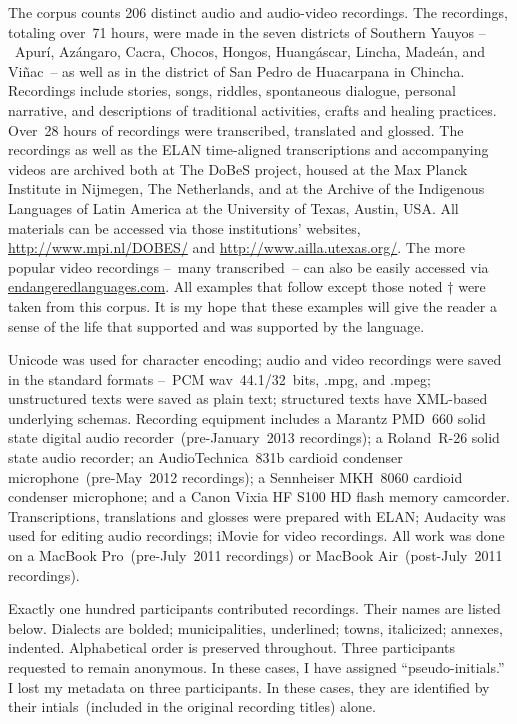 The corpus counts 206 distinct audio and audio-video recordings. The recordings, totaling over~71 hours, were made in the seven districts of Southern Yauyos --~Apurí, Azángaro, Cacra, Chocos, Hongos, Hu\-angáscar, Lincha, Madeán, and Viñac~-- as well as in the district of San Pedro de Huacarpana in Chincha. Recordings include stories, songs, riddles, spontaneous dialogue, personal narrative, and descriptions of traditional activities, crafts and healing practices. Over~28 hours of recordings were transcribed, translated and glossed. The recordings as well as the ELAN time-aligned transcriptions and accompanying videos are archived both at The DoBeS project, housed at the Max Planck Institute in Nijmegen, The Netherlands, and at the Archive of the Indigenous Languages of Latin America at the University of Texas, Austin, USA. All materials can be accessed via those institutions’ websites, \url{http://www.mpi.nl/DOBES/} and \url{http://www.ailla.utexas.org/}. The more popular video recordings --~many transcribed~-- can also be easily accessed via \url{endangeredlanguages.com}. All examples that follow except those noted † were taken from this corpus. It is my hope that these examples will give the reader a sense of the life that supported and was supported by the language. 

Unicode was used for character encoding; audio and video recordings were saved in the standard formats --~PCM \textrm{wav}~44.1/32~bits, \textrm{.mpg}, and \textrm{.mpeg}; unstructured texts were saved as plain text; structured texts have XML-based underlying schemas. Recording equipment includes a Marantz PMD~660 solid state digital audio recorder~(pre-January~2013 recordings); a Roland~R-26 solid state audio recorder; an AudioTechnica~831b cardioid condenser microphone~(pre-May~2012 recordings); a Sennheiser MKH~8060 cardioid condenser microphone; and a Canon Vixia HF S100 HD flash memory camcorder. Transcriptions, translations and glosses were prepared with ELAN; Audacity was used for editing audio recordings; iMovie for video recordings. All work was done on a MacBook Pro~(pre-July~2011 recordings) or MacBook Air~(post-July~2011 recordings). 

Exactly one hundred participants contributed recordings. Their names are listed below. Dialects are bolded; municipalities, underlined; towns, italicized; annexes, indented. Alphabetical order is preserved throughout. Three participants requested to remain anonymous. In these cases, I have assigned “pseudo-initials.” I lost my metadata on three participants. In these cases, they are identified by their intials~(included in the original recording titles) alone.\\


